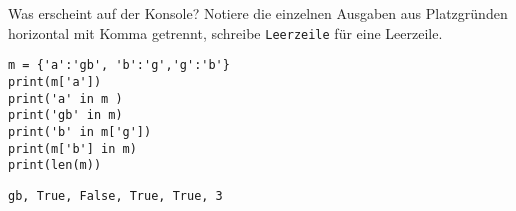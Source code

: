 \question[6] Was erscheint auf der Konsole?
 Notiere die einzelnen Ausgaben aus Platzgründen horizontal mit Komma getrennt,
 schreibe \texttt{Leerzeile} für eine Leerzeile.
\begin{lstlisting}
m = {'a':'gb', 'b':'g','g':'b'}
print(m['a'])
print('a' in m )
print('gb' in m)
print('b' in m['g'])
print(m['b'] in m)
print(len(m))
\end{lstlisting}
\begin{solutionbox}{2cm}
\texttt{gb, True, False, True, True, 3}
\end{solutionbox}
